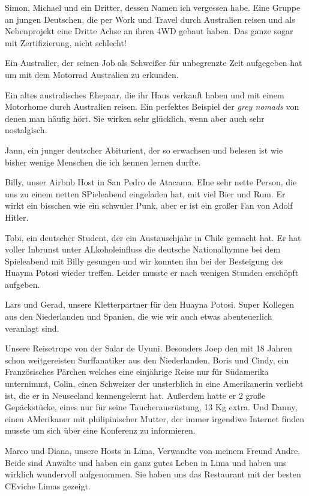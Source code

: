 \documentclass[11pt]{book}
\begin{document}
Simon, Michael und ein Dritter, dessen Namen ich vergessen habe. Eine Gruppe an jungen Deutschen, die per Work und Travel durch 
Australien reisen und als Nebenprojekt eine Dritte Achse an ihren 4WD gebaut haben. Das ganze sogar mit Zertifizierung, nicht schlecht!

Ein Australier, der seinen Job als Schweißer für unbegrenzte Zeit aufgegeben hat um mit dem Motorrad Australien zu erkunden.

Ein altes australisches Ehepaar, die ihr Haus verkauft haben und mit einem Motorhome durch Australien reisen. Ein perfektes 
Beispiel der \emph{grey nomads} von denen man häufig hört. Sie wirken sehr glücklich, wenn aber auch sehr nostalgisch.

Jann, ein junger deutscher Abiturient, der so erwachsen und belesen ist wie bisher wenige Menschen die ich kennen lernen durfte.

Billy, unser Airbnb Host in San Pedro de Atacama. EIne sehr nette Person, die uns zu einem netten SPieleabend eingeladen hat, mit viel Bier und Rum. 
Er wirkt ein bisschen wie ein schwuler Punk, aber er ist ein großer Fan von Adolf Hitler. 

Tobi, ein deutscher Student, der ein Austauschjahr in Chile gemacht hat. Er hat voller Inbrunst unter ALkoholeinfluss die deutsche Nationalhymne bei dem 
Spieleabend mit Billy gesungen und wir konnten ihn bei der Besteigung des Huayna Potosi wieder treffen. Leider musste er nach wenigen Stunden erschöpft aufgeben. 

Lars und Gerad, unsere Kletterpartner für den Huayna Potosi. Super Kollegen aus den Niederlanden und Spanien, die wie wir auch etwas abenteuerlich veranlagt sind.

Unsere Reisetrupe von der Salar de Uyuni. Besonders Joep den mit 18 Jahren schon weitgereisten Surffanatiker aus den Niederlanden, Boris und Cindy, ein Französisches 
Pärchen welches eine einjährige Reise nur für Südamerika unternimmt, Colin, einen Schweizer der unsterblich in eine Amerikanerin verliebt ist, die er in 
Neuseeland kennengelernt hat. Außerdem hatte er 2 große Gepäckstücke, eines nur für seine Taucherausrüstung, 13 Kg extra. Und Danny, einen AMerikaner mit philipinischer 
Mutter, der immer irgendiwe Internet finden musste um sich über eine Konferenz zu informieren. 

Marco und Diana, unsere Hosts in Lima, Verwandte von meinem Freund Andre. Beide sind Anwälte und haben ein ganz gutes Leben in Lima und haben uns wirklich wundervoll 
aufgenommen. Sie haben uns das Restaurant mit der besten CEviche Limas gezeigt. 
\end{document}
